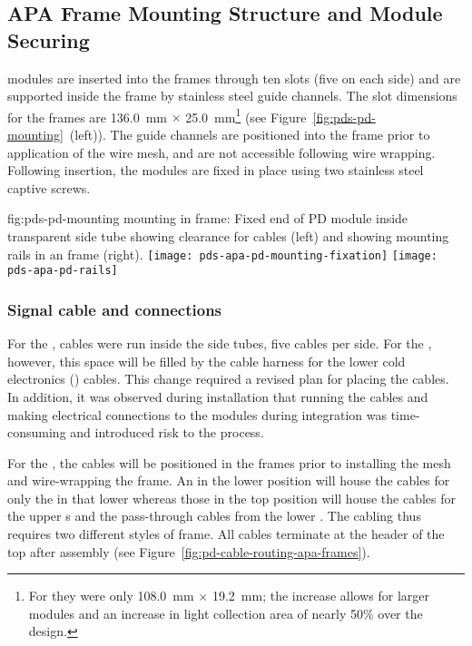 \subsection{APA Frame Mounting Structure and Module Securing}	
\label{sec:fdsp-pd-assy-frames}

 modules are inserted into the  frames through ten slots (five on each side) and are supported inside the frame by stainless steel guide channels.  The slot dimensions for the   frames 
are \SI{136.0}{mm} $\times$ \SI{25.0}{mm}\footnote{For  they were only \SI{108.0}{mm} $\times$ \SI{19.2}{mm}; the increase allows for larger  modules and an increase in light collection area of nearly 50\% over the  design.}   
(see Figure~\ref{fig:pds-pd-mounting}~(left)).
The guide channels are positioned into the  frame prior to application of the wire mesh, and are not accessible following wire wrapping. Following insertion, the  modules are fixed in place using two stainless steel captive screws.

\begin{dunefigure}{fig:pds-pd-mounting}
{ mounting in  frame: Fixed end of PD module inside transparent  side tube showing clearance for  cables (left) and showing  mounting rails in an  frame  (right).}
	\texttt{[image: pds-apa-pd-mounting-fixation]}
	\texttt{[image: pds-apa-pd-rails]}
\end{dunefigure}

\subsubsection{Signal cable and connections}

For the ,  cables were run inside the  side tubes, five cables per side.  For the , however, this space will be filled by the cable harness for the lower  cold electronics () cables.  This change required a revised plan for placing the  cables.  In addition, it was observed during   installation that running the  cables and making electrical connections to the modules during  integration was time-consuming and introduced risk to the process.

For the , the  cables will be %
positioned in the  frames prior to installing the %
mesh and wire-wrapping the frame.  
An  in the lower position will house the cables for only the  in that lower  whereas those in the top position will house the cables for the upper  s and the pass-through cables from the lower . The cabling thus requires two different styles of  frame. All cables terminate at the header of the top  after assembly (see Figure~\ref{fig:pd-cable-routing-apa-frames}).

